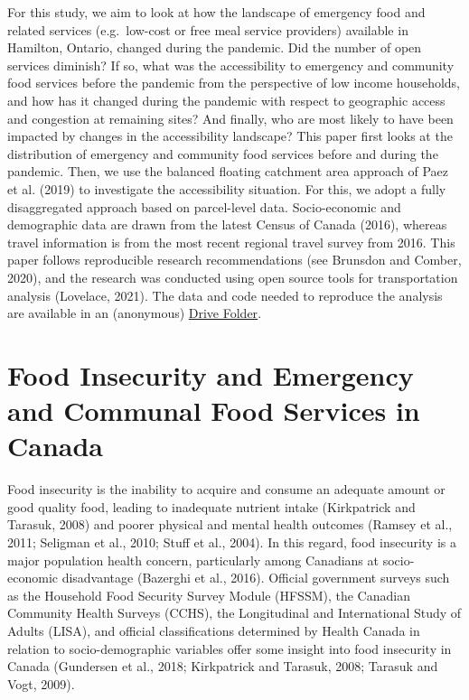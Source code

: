\documentclass[]{elsarticle} %
\begin{document}
For this study, we aim to look at how the landscape of emergency food
and related services (e.g.~low-cost or free meal service providers)
available in Hamilton, Ontario, changed during the pandemic. Did the
number of open services diminish? If so, what was the accessibility to
emergency and community food services before the pandemic from the
perspective of low income households, and how has it changed during the
pandemic with respect to geographic access and congestion at remaining
sites? And finally, who are most likely to have been impacted by changes
in the accessibility landscape? This paper first looks at the
distribution of emergency and community food services before and during
the pandemic. Then, we use the balanced floating catchment area approach
of Paez et al. (2019) to investigate the accessibility situation. For
this, we adopt a fully disaggregated approach based on parcel-level
data. Socio-economic and demographic data are drawn from the latest
Census of Canada (2016), whereas travel information is from the most
recent regional travel survey from 2016. This paper follows reproducible
research recommendations (see Brunsdon and Comber, 2020), and the
research was conducted using open source tools for transportation
analysis (Lovelace, 2021). The data and code needed to reproduce the
analysis are available in an (anonymous)
\href{https://drive.google.com/drive/folders/1-l8hO1pMIqaBqf57j_M_BMrXhXFvrV2c?usp=sharing}{Drive
Folder}.

\hypertarget{food-insecurity-and-emergency-and-communal-food-services-in-canada}{%
\section{Food Insecurity and Emergency and Communal Food Services in
Canada}\label{food-insecurity-and-emergency-and-communal-food-services-in-canada}}

Food insecurity is the inability to acquire and consume an adequate
amount or good quality food, leading to inadequate nutrient intake
(Kirkpatrick and Tarasuk, 2008) and poorer physical and mental health
outcomes (Ramsey et al., 2011; Seligman et al., 2010; Stuff et al.,
2004). In this regard, food insecurity is a major population health
concern, particularly among Canadians at socio-economic disadvantage
(Bazerghi et al., 2016). Official government surveys such as the
Household Food Security Survey Module (HFSSM), the Canadian Community
Health Surveys (CCHS), the Longitudinal and International Study of
Adults (LISA), and official classifications determined by Health Canada
in relation to socio-demographic variables offer some insight into food
insecurity in Canada (Gundersen et al., 2018; Kirkpatrick and Tarasuk,
2008; Tarasuk and Vogt, 2009).
\end{document}
